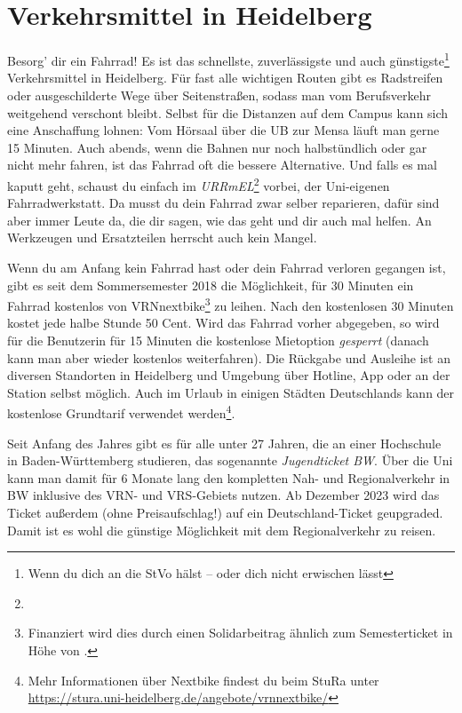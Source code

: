 \section{Verkehrsmittel in Heidelberg}
\label{verkehrsmittel}

Besorg' dir ein Fahrrad! Es ist das schnellste, zuverlässigste und auch günstigste\footnote{Wenn du dich an die StVo hälst -- oder dich nicht erwischen lässt} Verkehrsmittel in Heidelberg. Für fast alle wichtigen Routen gibt es Radstreifen oder ausgeschilderte Wege über Seitenstraßen, sodass man vom Berufsverkehr weitgehend verschont bleibt. Selbst für die Distanzen auf dem Campus kann sich eine Anschaffung lohnen: Vom Hörsaal über die \gls{UB} zur Mensa läuft man gerne 15 Minuten. Auch abends, wenn die Bahnen nur noch halbstündlich oder gar nicht mehr fahren, ist das Fahrrad oft die bessere Alternative. Und falls es mal kaputt geht, schaust du einfach im \emph{URRmEL}\footnote{\urrmelOeff} vorbei, der Uni-eigenen Fahrradwerkstatt. Da musst du dein Fahrrad zwar selber reparieren, dafür sind aber immer Leute da, die dir sagen, wie das geht und dir auch mal helfen. An Werkzeugen und Ersatzteilen herrscht auch kein Mangel.

\label{nextbike}
Wenn du am Anfang kein Fahrrad hast oder dein Fahrrad verloren gegangen ist, gibt es seit dem Sommersemester 2018 die Möglichkeit, für 30 Minuten ein Fahrrad kostenlos von VRNnextbike\footnote{Finanziert wird dies durch einen Solidarbeitrag ähnlich zum Semesterticket in Höhe von \EUR{\vrnextbikebeitrag}.} zu leihen. Nach den kostenlosen 30 Minuten kostet jede halbe Stunde 50 Cent. Wird das Fahrrad vorher abgegeben, so wird für die Benutzerin für 15 Minuten die kostenlose Mietoption \emph{gesperrt} (danach kann man aber wieder kostenlos weiterfahren). Die Rückgabe und Ausleihe ist an diversen Standorten in Heidelberg und Umgebung über Hotline, App oder an der Station selbst möglich. Auch im Urlaub in einigen Städten Deutschlands kann der kostenlose Grundtarif verwendet werden\footnote{Mehr Informationen über Nextbike findest du beim StuRa unter \url{https://stura.uni-heidelberg.de/angebote/vrnnextbike/}}.

Seit Anfang des Jahres gibt es für alle unter 27 Jahren, die an einer Hochschule in Baden-Württemberg studieren, das sogenannte \emph{Jugendticket BW}. Über die Uni kann man damit für  6 Monate lang den kompletten Nah- und Regionalverkehr in BW inklusive des VRN- und VRS-Gebiets nutzen. Ab Dezember 2023 wird das Ticket außerdem (ohne Preisaufschlag!) auf ein Deutschland-Ticket geupgraded. Damit ist es wohl die günstige Möglichkeit mit dem Regionalverkehr zu reisen.

